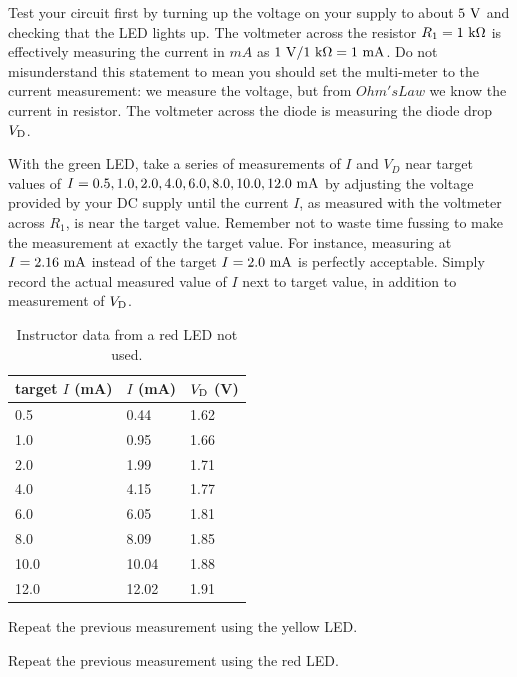 Test your circuit first by turning up the voltage on your supply to
about $5~\rm V$ and checking that the LED lights up.  The voltmeter
across the resistor $R_1=1~\rm k\Omega$ is effectively measuring the
current in $mA$ as $1~{\rm V}/1~{\rm k\Omega} = 1~\rm mA$.  Do not
misunderstand this statement to mean you should set the multi-meter to
the current measurement: we measure the voltage, but from $Ohm's Law$
we know the current in resistor.  The voltmeter across the diode is
measuring the diode drop $V_{\rm D}$.

\begin{measurement}
With the green LED, take a series of measurements of $I$ and $V_D$
near target values of $I = 0.5,1.0,2.0,4.0,6.0,8.0,10.0,12.0~\rm mA$
by adjusting the voltage provided by your DC supply until the current
$I$, as measured with the voltmeter across $R_1$, is near the target
value.  Remember not to waste time fussing to make the measurement at
exactly the target value.  For instance, measuring at $I=2.16~\rm mA$
instead of the target $I=2.0 ~\rm mA$ is perfectly acceptable.  Simply
record the actual measured value of $I$ next to target value, in
addition to measurement of $V_{\rm D}$.
\end{measurement}

\begin{table}
\begin{center}
\caption{Instructor data from a red LED not used.}
\begin{tabular}{lll}
target $I$ (mA) & $I$ (mA) & $V_{\rm D}$ (V) \\
\hline
0.5  &  0.44  & 1.62 \\
1.0  &  0.95  & 1.66 \\
2.0  &  1.99  & 1.71 \\
4.0  &  4.15  & 1.77 \\
6.0  &  6.05  & 1.81 \\
8.0  &  8.09  & 1.85 \\
10.0 &  10.04 & 1.88 \\
12.0 &  12.02 & 1.91 \\ 
\end{tabular}
\end{center}
\end{table}

\begin{measurement}
Repeat the previous measurement using the yellow LED.
\end{measurement}

\begin{measurement}
Repeat the previous measurement using the red LED.  
\end{measurement}

